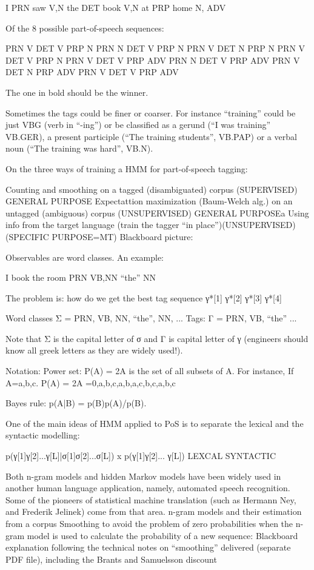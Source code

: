 I {PRN}
saw {V,N}
the {DET}
book {V,N}
at {PRP}
home {N, ADV}

Of the 8 possible part-of-speech sequences:

PRN V DET V PRP N
PRN N DET V PRP N
PRN V DET N PRP N
PRN V DET V PRP N
PRN V DET V PRP ADV 
PRN N DET V PRP ADV
PRN V DET N PRP ADV
PRN V DET V PRP ADV

The one in bold should be the winner.

Sometimes the tags could be finer or coarser. For instance “training” could be just VBG (verb in “-ing”) or be classified as a gerund (“I was training” VB.GER), a present participle (“The training students”, VB.PAP) or a verbal noun (“The training was hard”, VB.N).

On the three ways of training a HMM for part-of-speech tagging:

Counting and smoothing on a tagged (disambiguated) corpus (SUPERVISED) GENERAL PURPOSE
Expectattion maximization (Baum-Welch alg.) on an untagged (ambiguous) corpus (UNSUPERVISED) GENERAL PURPOSEa
Using info from the target language (train the tagger “in place”)(UNSUPERVISED) (SPECIFIC PURPOSE=MT)
Blackboard picture:


Observables are word classes. An example:

I book the room
{PRN} {VB,NN} “the” {NN}

The problem is: how do we get the best tag sequence γ*[1] γ*[2] γ*[3] γ*[4]

Word classes Σ = { {PRN}, {VB, NN}, “the”, {NN}, ...}
Tags: Γ = { PRN, VB, “the” ...}

Note that Σ is the capital letter of σ and Γ is capital letter of γ (engineers should know all greek letters as they are widely used!).

Notation: Power set: P(A) = 2A  is the set of all subsets of A. For instance, If A={a,b,c}. P(A) = 2A ={0,{a},{b},{c},{a,b},{a,c},{b,c},{a,b,c}}

Bayes rule: p(A|B) = p(B)p(A)/p(B).

One of the main ideas of HMM applied to PoS is to separate the lexical and the syntactic modelling:	
	 	
p(γ[1]γ[2]...γ[L]|σ[1]σ[2]...σ[L])	x	p(γ[1]γ[2]... γ[L])
{		LEXCAL	 }		{ SYNTACTIC }




Both n-gram models and hidden Markov models have been widely used in another human language  application, namely, automated speech recognition. Some of the pioneers of statistical machine translation (such as Hermann Ney, and Frederik Jelinek) come from that area.
n-gram models and their estimation from a corpus
Smoothing to avoid the problem of zero probabilities when the n-gram model is used to calculate the probability of a new sequence: Blackboard explanation following the technical notes on “smoothing” delivered (separate PDF file), including the Brants and Samuelsson discount

